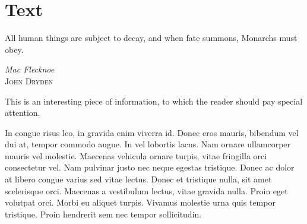 \chapter{Text}
\label{ch:ch2}

\begin{singlespace} %
	\epigraph{All human things are subject to decay, and when fate summons, Monarchs must obey.}{\textit{Mac Flecknoe} \\ \textsc{John Dryden}}
\end{singlespace}

\begin{notice}
	This is an interesting piece of information, to which the reader should pay special attention.
\end{notice}

\lipsum[6]

\begin{highlight}[Problem 1]
	In congue risus leo, in gravida enim viverra id. Donec eros mauris, bibendum vel dui at, tempor commodo augue. In vel lobortis lacus. Nam ornare ullamcorper mauris vel molestie. Maecenas vehicula ornare turpis, vitae fringilla orci consectetur vel. Nam pulvinar justo nec neque egestas tristique. Donec ac dolor at libero congue varius sed vitae lectus. Donec et tristique nulla, sit amet scelerisque orci. Maecenas a vestibulum lectus, vitae gravida nulla. Proin eget volutpat orci. Morbi eu aliquet turpis. Vivamus molestie urna quis tempor tristique. Proin hendrerit sem nec tempor sollicitudin.
\end{highlight}